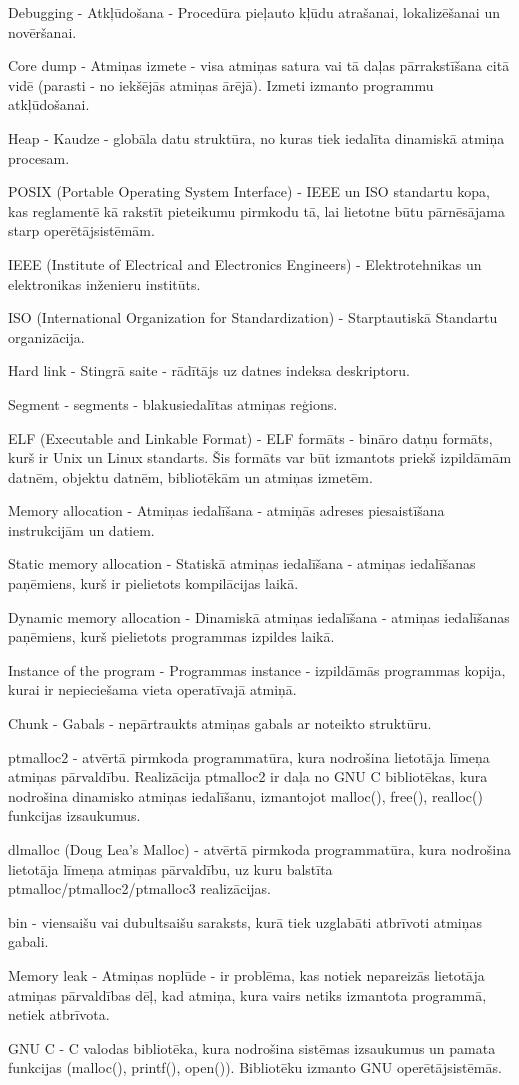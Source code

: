 \noindent 

Debugging - Atkļūdošana - Procedūra pieļauto kļūdu atrašanai, lokalizēšanai un novēršanai.

Core dump - Atmiņas izmete - visa atmiņas satura vai tā daļas pārrakstīšana citā vidē (parasti - no iekšējās atmiņas ārējā). 
Izmeti izmanto programmu atkļūdošanai.

Heap - Kaudze - globāla datu struktūra,  no kuras tiek iedalīta dinamiskā atmiņa procesam.

POSIX (Portable Operating System Interface) - IEEE un ISO standartu kopa,  kas reglamentē kā rakstīt pieteikumu pirmkodu tā, lai lietotne būtu pārnēsājama starp operētājsistēmām.

IEEE (Institute of Electrical and Electronics Engineers) - Elektrotehnikas un elektronikas inženieru institūts.

ISO (International Organization for Standardization) - Starptautiskā Standartu organizācija.

Hard link - Stingrā saite - rādītājs uz datnes indeksa deskriptoru. 

Segment - segments - blakusiedalītas atmiņas reģions.

ELF (Executable and Linkable Format) - ELF formāts -  bināro datņu formāts, kurš ir Unix un Linux standarts. Šis formāts var būt izmantots priekš izpildāmām datnēm, objektu datnēm, bibliotēkām un atmiņas izmetēm.

Memory allocation - Atmiņas iedalīšana - atmiņās adreses piesaistīšana instrukcijām un datiem.

Static memory allocation - Statiskā atmiņas iedalīšana -  atmiņas iedalīšanas paņēmiens, kurš ir pielietots kompilācijas laikā.

Dynamic memory allocation - Dinamiskā atmiņas iedalīšana - atmiņas iedalīšanas paņēmiens, kurš pielietots programmas izpildes laikā. 

Instance of the program - Programmas instance - izpildāmās programmas kopija, kurai ir nepieciešama vieta operatīvajā atmiņā.

Chunk - Gabals - nepārtraukts atmiņas gabals ar noteikto struktūru.

ptmalloc2 - atvērtā pirmkoda programmatūra, kura nodrošina lietotāja līmeņa atmiņas pārvaldību. Realizācija ptmalloc2 ir daļa no GNU C bibliotēkas, kura nodrošina dinamisko atmiņas iedalīšanu, izmantojot malloc(), free(), realloc() funkcijas izsaukumus.

dlmalloc (Doug Lea's Malloc) - atvērtā pirmkoda programmatūra, kura nodrošina lietotāja līmeņa atmiņas pārvaldību, uz kuru balstīta ptmalloc/ptmalloc2/ptmalloc3 realizācijas.

bin - viensaišu vai dubultsaišu saraksts, kurā tiek uzglabāti atbrīvoti atmiņas gabali.

Memory leak - Atmiņas noplūde - ir problēma, kas notiek nepareizās lietotāja atmiņas pārvaldības dēļ, kad atmiņa, kura vairs netiks izmantota programmā, netiek atbrīvota.

GNU C - C valodas bibliotēka, kura nodrošina sistēmas izsaukumus un pamata funkcijas (malloc(), printf(), open()). Bibliotēku izmanto GNU operētājsistēmās.
